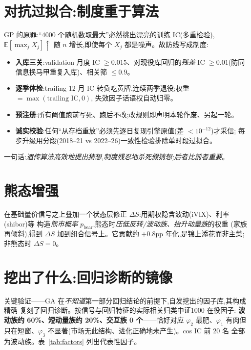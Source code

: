\documentclass[11pt,a4paper,fontset=mac]{ctexart}
\begin{document}
\section{对抗过拟合:制度重于算法}
GP 的原罪:``4000 个随机数取最大''必然挑出漂亮的训练 IC(多重检验),
$\mathbb E[\max_j X_j]\uparrow$ 随 $n$ 增长,即使每个 $X_j$ 都是噪声。故防线写成制度:
\begin{itemize}
\item \textbf{入库三关}:validation 月度 IC $\ge0.015$、对现役库回归的\emph{残差} IC
$\ge0.01$(防同信息换马甲重复入库)、相关筛 $\le0.9$。
\item \textbf{逐季体检}:trailing 12 月 IC 转负吃黄牌,连续两季退役;权重 $=\max(\text{trailing IC},0)$,
失效因子话语权自动归零。
\item \textbf{预注册}:所有阈值跑前写死、跑后不改;改规则即声明本轮作废、另起一轮。
\item \textbf{诚实校验}:任何``从存档重放''必须先逐日复现引擎原值(差 $<10^{-12}$)才采信;
每步升级用分段(2018--21 vs 2022--26)一致性检验排除单时段过拟合。
\end{itemize}
一句话:\emph{遗传算法高效地提出猜想,制度残忍地杀死假猜想;后者比前者重要}。

\section{熊态增强}
在基础量价信号之上叠加一个状态层修正 $\Delta S$:用期权隐含波动(iVIX)、利率(shibor)等
构造\emph{熊市概率} $p_{\text{bear}}$,熊态时\emph{压低反转/波动族、抬升动量族}的权重
(家族再倾斜),得到 $\Delta S$ 加到组合信号上。它贡献约 $+0.8$pp 年化,是锦上添花而非主菜;
非熊态时 $\Delta S=0$。

\section{挖出了什么:回归诊断的镜像}
关键验证——GA 在\emph{不知道}第一部分回归结论的前提下,自发挖出的因子库,其构成精确
复刻了回归诊断。按信号与回归特征的实际相关归类中证1000 在役因子:
\textbf{波动族约 60\%、短动量族约 20\%、交互族 0 个}——恰好对应 $\varphi_2$ 最肥、$\varphi_1$
有肉但只在短窗、$\varphi_3$ 不显著(市场无此结构、进化正确地未产生)。cos IC 前 20 名
全部为波动族。表~\ref{tab:factors} 列出代表性因子。
\end{document}
